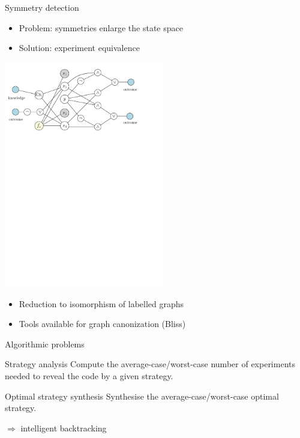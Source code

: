 \documentclass{beamer}
\begin{document}
\begin{frame}{Symmetry detection}
\begin{itemize}
\item Problem: symmetries enlarge the state space
\item Solution: experiment equivalence
\end{itemize}
\pause
\centerline{\includegraphics[width=7cm]{../pictures/exp-graph-sim.pdf}}
\begin{itemize}
\item Reduction to isomorphism of labelled graphs
\item Tools available for graph canonization (Bliss)
\end{itemize}
\end{frame}

\begin{frame}{Algorithmic problems}
\begin{block}{Strategy analysis}
Compute the average-case/worst-case number of experiments needed
  to reveal the code by a given strategy.
\end{block}\pause
\bigskip
\begin{block}{Optimal strategy synthesis}
Synthesise the average-case/worst-case optimal strategy.
\end{block}\pause

\bigskip
\centerline{$\Longrightarrow$ intelligent backtracking}
\end{frame}
\end{document}
